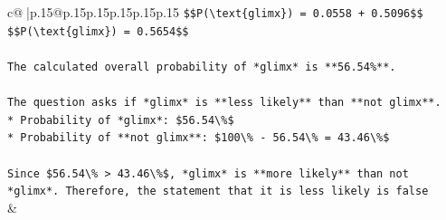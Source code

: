 \documentclass{article}
\begin{document}
{\begin{supertabular}{c@{$\;$}|p{.15\linewidth}@{}p{.15\linewidth}p{.15\linewidth}p{.15\linewidth}p{.15\linewidth}p{.15\linewidth}}
{{{\texttt{\$\$P(\textbackslash{}text\{glimx\}) = 0.0558 + 0.5096\$\$} \\
\texttt{\$\$P(\textbackslash{}text\{glimx\}) = 0.5654\$\$} \\
\\ 
\texttt{The calculated overall probability of *glimx* is **56.54\%**.} \\
\\ 
\texttt{The question asks if *glimx* is **less likely** than **not glimx**.} \\
\texttt{*   Probability of *glimx*: \$56.54\textbackslash{}\%\$} \\
\texttt{*   Probability of **not glimx**: \$100\textbackslash{}\% {-} 56.54\textbackslash{}\% = 43.46\textbackslash{}\%\$} \\
\\ 
\texttt{Since \$56.54\textbackslash{}\% > 43.46\textbackslash{}\%\$, *glimx* is **more likely** than not *glimx*. Therefore, the statement that it is less likely is false} \\
            }
        }
    }
    & \\ \\


\end{supertabular}}
\end{document}
